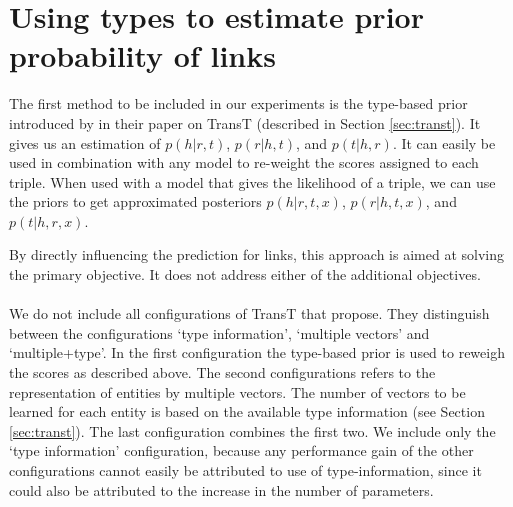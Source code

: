 



\section{Using types to estimate prior probability of links}
\label{sec:method_type_linkprior}
%
The first method to be included in our experiments is the type-based prior introduced by \citeauthor{ma2017transt} in their paper on TransT (described in Section \ref{sec:transt}). 
It gives us an estimation of $p(h|r,t)$, $p(r|h,t)$, and $p(t|h,r)$.
It can easily be used in combination with any model to re-weight the scores assigned to each triple.
When used with a model that gives the likelihood of a triple, we can use the priors to get  approximated posteriors $p(h|r,t,x)$, $p(r|h,t,x)$, and $p(t|h,r,x)$.

By directly influencing the prediction for links, this approach is aimed at solving the primary objective. It does not address either of the additional objectives.

\paragraph{}\noindent
We do not include all configurations of TransT that \citeauthor{ma2017transt} propose. They distinguish between the configurations `type information', `multiple vectors' and `multiple+type'. In the first configuration the type-based prior is used to reweigh the scores as described above.
The second configurations refers to the representation of entities by multiple vectors. The number of vectors to be learned for each entity is based on the available type information (see Section \ref{sec:transt}). The last configuration combines the first two.
We include only the `type information' configuration, because any performance gain of the other configurations cannot easily be attributed to use of type-information, since it could also be attributed to the increase in the number of parameters.


